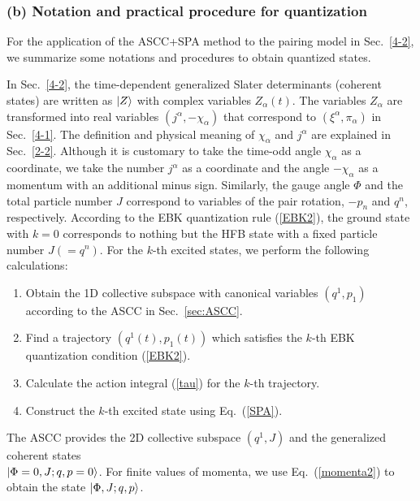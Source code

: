 \documentclass[11pt]{book} %
\begin{document}
\subsubsection{(b) Notation and practical procedure for quantization}
\label{sec:notation}

For the application of the ASCC+SPA method to the pairing model in Sec.~\ref{4-2},
we summarize some notations and procedures to obtain quantized states.

In Sec.~\ref{4-2}, the time-dependent generalized Slater determinants
(coherent states) are written as $\ket{Z}$ with complex variables
$Z_\alpha(t)$.
The variables $Z_\alpha$ are transformed into real variables
$(j^\alpha, -\chi_\alpha)$ that correspond to $(\xi^\alpha,\pi_\alpha)$
in Sec.~\ref{4-1}.
The definition and physical meaning of $\chi_\alpha$ and $j^\alpha$ are explained in Sec.~\ref{2-2}.
Although it is customary to take the time-odd angle $\chi_\alpha$ as a coordinate,
we take the number $j^\alpha$ as a coordinate and the angle $-\chi_\alpha$ as a momentum with an additional minus sign.
Similarly, the gauge angle $\Phi$ and the total particle number $J$
correspond to variables of the pair rotation, $-p_n$ and $q^n$, respectively.
According to the EBK quantization rule (\ref{EBK2}),
the ground state with $k=0$ corresponds to nothing but the HFB state
with a fixed particle number $J(=q^n)$.
For the $k$-th excited states, we perform the following calculations:
\begin{enumerate}
\item Obtain the 1D collective subspace with canonical variables $(q^1,p_1)$
	according to the ASCC in Sec.~\ref{sec:ASCC}.
\item Find a trajectory $(q^1(t),p_1(t))$ which satisfies
the $k$-th EBK quantization condition (\ref{EBK2}).
\item Calculate the action integral (\ref{tau}) for the $k$-th trajectory.
\item Construct the $k$-th excited state using Eq.~(\ref{SPA}).
\end{enumerate}
The ASCC provides the 2D collective subspace $(q^1,J)$
and the generalized coherent states \\
$\ket{\Phi=0,J;q,p=0}$.
For finite values of momenta, we use Eq.~(\ref{momenta2})
to obtain the state $\ket{\Phi,J;q,p}$.
\end{document}
